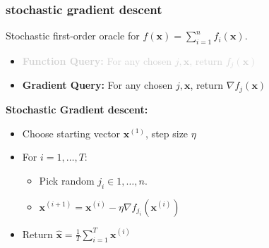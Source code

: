 \documentclass[compress]{beamer}
\newcommand{\bv}[1]{\mathbf{#1}}
\begin{document}
\begin{frame}[t]
	\frametitle{stochastic gradient descent}
   {Stochastic first-order oracle} for $f(\bv{x}) = \sum_{i=1}^n f_i(\bv{x})$. 
	\begin{itemize}
		\item \textcolor{lightgray}{ \textbf{Function Query:} For any chosen $j, \bv{x}$, return $f_j(\bv{x})$}
		\item \textbf{Gradient Query:} For any chosen $j, \bv{x}$, return $\nabla f_j(\bv{x})$
	\end{itemize}

	\textbf{Stochastic Gradient descent:}
	\begin{itemize}
		\item Choose starting vector $\bv{x}^{(1)}$, step size $\eta$
		\item For $i = 1,\ldots, T$:
		\begin{itemize}
			\item Pick random $j_i \in 1, \ldots, n$.
			\item $\bv{x}^{(i+1)} = \bv{x}^{(i)} - \eta \nabla f_{j_i}(\bv{x}^{(i)})$
		\end{itemize}
		\item Return $\hat{\bv{x}} = \frac{1}{T}\sum_{i=1}^T \bv{x}^{(i)}$
	\end{itemize}
\end{frame}
\end{document}
